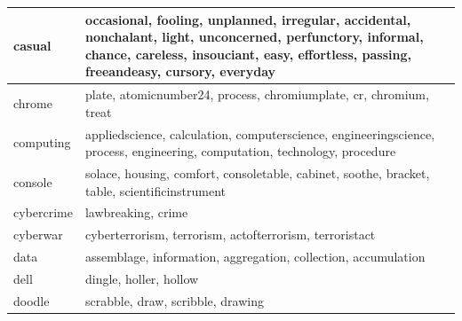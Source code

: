\documentclass[12pt,a4paper]{report}
\begin{document}
\begin{table}[H]
\begin{center}
\begin{tabular}{ |l|p{13cm}|}
\hline
casual & occasional, fooling, unplanned, irregular, accidental, nonchalant, light, unconcerned, perfunctory, informal, chance, careless, insouciant, easy, effortless, passing, freeandeasy, cursory, everyday\\
\hline
chrome & plate, atomicnumber24, process, chromiumplate, cr, chromium, treat\\
\hline
computing & appliedscience, calculation, computerscience, engineeringscience, process, engineering, computation, technology, procedure\\
\hline
console & solace, housing, comfort, consoletable, cabinet, soothe, bracket, table, scientificinstrument\\
\hline
cybercrime & lawbreaking, crime\\
\hline
cyberwar & cyberterrorism, terrorism, actofterrorism, terroristact\\
\hline

data & assemblage, information, aggregation, collection, accumulation\\
\hline
dell & dingle, holler, hollow\\
\hline
doodle & scrabble, draw, scribble, drawing\\
\hline



\end{tabular}
\end{center}
\end{table}
\end{document}
